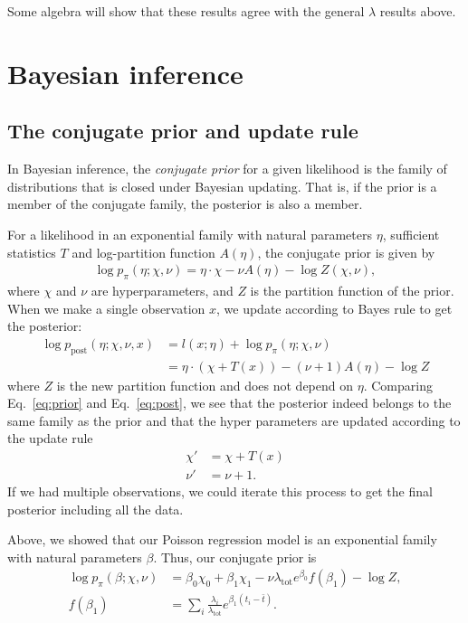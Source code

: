 \documentclass[12pt, letterpaper]{article}
\newcommand{ \lambtot }{\lambda_{\text{tot}}}
\begin{document}
Some algebra will show that these results agree with the general $\lambda$ results above.

\section{Bayesian inference}

\subsection{The conjugate prior and update rule}

In Bayesian inference, the \emph{conjugate prior} for a given likelihood is the family of distributions that is closed under Bayesian updating.
That is, if the prior is a member of the conjugate family, the posterior is also a member.

For a likelihood in an exponential family with natural parameters $\eta$, sufficient statistics $T$ and log-partition function $A(\eta)$, the conjugate prior is given by
\begin{align}
    \log p_\pi(\eta; \chi, \nu) = \eta \cdot \chi - \nu A(\eta) - \log Z(\chi, \nu),
    \label{eq:prior}
\end{align}
where $\chi$ and $\nu$ are hyperparameters, and $Z$ is the partition function of the prior.
When we make a single observation $x$, we update according to Bayes rule to get the posterior:
\begin{align}
    \log p_\text{post}(\eta; \chi, \nu, x) &= l(x; \eta) + \log p_\pi(\eta; \chi, \nu) \\
                                           &= \eta \cdot (\chi + T(x)) - (\nu + 1) A(\eta) - \log Z
                                           \label{eq:post}
\end{align}
where $Z$ is the new partition function and does not depend on $\eta$.
Comparing Eq.~\ref{eq:prior} and Eq.~\ref{eq:post}, we see that the posterior indeed belongs to the same family as the prior and that the hyper parameters are updated according to the update rule
\begin{align}
    \chi' & = \chi + T(x) \\
    \nu' & = \nu + 1.
\end{align}
If we had multiple observations, we could iterate this process to get the final posterior including all the data.

Above, we showed that our Poisson regression model is an exponential family with natural parameters $\beta$.
Thus, our conjugate prior is
\begin{align}
    \log p_\pi(\beta; \chi, \nu) & = \beta_0 \chi_0 + \beta_1 \chi_1 - \nu \lambtot e^{\beta_0} f(\beta_1) - \log Z, \\
    f(\beta_1) & = \sum_i \frac{\lambda_i}{\lambtot} e^{\beta_1 (t_i - \bar{t})}.
\end{align}
\end{document}
